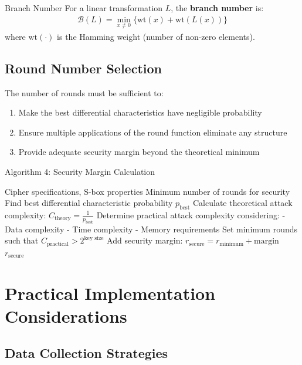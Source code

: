 \documentclass[12pt,a4paper]{article}
\theoremstyle{definition}
\begin{document}
\begin{definitionbox}{Branch Number}
For a linear transformation $L$, the \textbf{branch number} is:
\begin{align}
\mathcal{B}(L) = \min_{x \neq 0} \{\text{wt}(x) + \text{wt}(L(x))\}
\end{align}
where $\text{wt}(\cdot)$ is the Hamming weight (number of non-zero elements).
\end{definitionbox}

\subsection{Round Number Selection}

The number of rounds must be sufficient to:

\begin{enumerate}
    \item Make the best differential characteristics have negligible probability
    \item Ensure multiple applications of the round function eliminate any structure
    \item Provide adequate security margin beyond the theoretical minimum
\end{enumerate}

\begin{algorithmbox}{Algorithm 4: Security Margin Calculation}
\begin{algorithmic}[1]
\REQUIRE Cipher specifications, S-box properties
\ENSURE Minimum number of rounds for security
\STATE Find best differential characteristic probability $p_{\text{best}}$
\STATE Calculate theoretical attack complexity: $C_{\text{theory}} = \frac{1}{p_{\text{best}}}$
\STATE Determine practical attack complexity considering:
\STATE \quad - Data complexity
\STATE \quad - Time complexity  
\STATE \quad - Memory requirements
\STATE Set minimum rounds such that $C_{\text{practical}} > 2^{\text{key size}}$
\STATE Add security margin: $r_{\text{secure}} = r_{\text{minimum}} + \text{margin}$
\RETURN $r_{\text{secure}}$
\end{algorithmic}
\end{algorithmbox}

\section{Practical Implementation Considerations}

\subsection{Data Collection Strategies}
\end{document}
